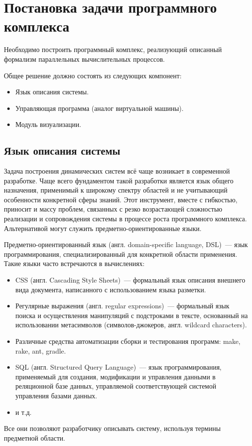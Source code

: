 \section{Постановка задачи программного комплекса}

Необходимо построить программный комплекс, реализующий описанный формализм параллельных вычислительных процессов.

Общее решение должно состоять из следующих компонент:
\begin{itemize}
	\item Язык описания системы.
	\item Управляющая программа (аналог виртуальной машины).
	\item Модуль визуализации.
\end{itemize}


\subsection{Язык описания системы}
Задача построения динамических систем всё чаще возникает в современной разработке. 
Чаще всего фундаментом такой разработки является язык общего назначения, применимый к широкому спектру областей и не учитывающий особенности конкретной сферы знаний.\cite{berry1989real}
Этот инструмент, вместе с гибкостью, приносит и массу проблем, связанных с резко возрастающей сложностью реализации и сопровождения системы в процессе роста программного комплекса.
Альтернативой могут служить предметно-ориентированные языки.

Предметно-ориентированный язык (англ. domain-specific language, DSL)~--- язык программирования, специализированный для конкретной области применения.
Такие языки часто встречаются в вычислениях:
\begin{itemize}
	\item CSS (англ. Cascading Style Sheets)~--- формальный язык описания внешнего вида документа, написанного с использованием языка разметки.
	\item Регулярные выражения (англ. regular expressions)~--- формальный язык поиска и осуществления манипуляций с подстроками в тексте, основанный на использовании метасимволов (символов-джокеров, англ. wildcard characters).
	\item Различные средства автоматизации сборки и тестирования программ: make, rake, ant, gradle.
	\item SQL (англ. Structured Query Language)~--- язык программирования, применяемый для создания, модификации и управления данными в реляционной базе данных, управляемой соответствующей системой управления базами данных.
	\item и т.д.
\end{itemize}
Все они позволяют разработчику описывать систему, используя термины предметной области.\cite{van2000domain}


